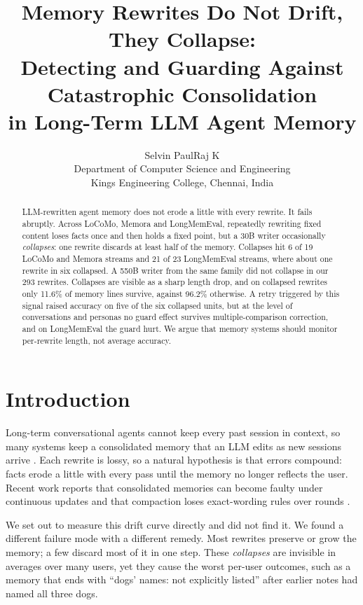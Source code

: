 \documentclass[11pt]{article}
\title{Memory Rewrites Do Not Drift, They Collapse:\\ Detecting and Guarding Against Catastrophic Consolidation\\ in Long-Term LLM Agent Memory}
\author{Selvin PaulRaj K \\
  Department of Computer Science and Engineering \\
  Kings Engineering College, Chennai, India}
\begin{document}
\maketitle

\begin{abstract}
LLM-rewritten agent memory does not erode a little with every rewrite. It fails abruptly. Across LoCoMo, Memora and LongMemEval, repeatedly rewriting fixed content loses facts once and then holds a fixed point, but a 30B writer occasionally \emph{collapses}: one rewrite discards at least half of the memory. Collapses hit 6 of 19 LoCoMo and Memora streams and 21 of 23 LongMemEval streams, where about one rewrite in six collapsed. A 550B writer from the same family did not collapse in our 293 rewrites. Collapses are visible as a sharp length drop, and on collapsed rewrites only 11.6\% of memory lines survive, against 96.2\% otherwise. A retry triggered by this signal raised accuracy on five of the six collapsed units, but at the level of conversations and personas no guard effect survives multiple-comparison correction, and on LongMemEval the guard hurt. We argue that memory systems should monitor per-rewrite length, not average accuracy.
\end{abstract}

\section{Introduction}
Long-term conversational agents cannot keep every past session in context, so many systems keep a consolidated memory that an LLM edits as new sessions arrive \citep{packer2023memgpt,chhikara2025mem0,xu2025amem,rasmussen2025zep}. Each rewrite is lossy, so a natural hypothesis is that errors compound: facts erode a little with every pass until the memory no longer reflects the user. Recent work reports that consolidated memories can become faulty under continuous updates \citep{zhang2026faulty} and that compaction loses exact-wording rules over rounds \citep{zerhoudi2026cliff}.

We set out to measure this drift curve directly and did not find it. We found a different failure mode with a different remedy. Most rewrites preserve or grow the memory; a few discard most of it in one step. These \emph{collapses} are invisible in averages over many users, yet they cause the worst per-user outcomes, such as a memory that ends with ``dogs' names: not explicitly listed'' after earlier notes had named all three dogs.
\end{document}
